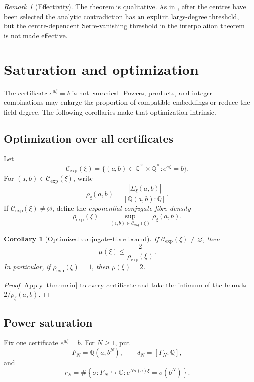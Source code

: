 \documentclass[11pt]{article}
\newcommand{\CC}{\mathbb C}
\newcommand{\QQ}{\mathbb Q}
\newcommand{\Qbar}{\overline{\mathbb Q}}
\newtheorem{corollary}[theorem]{Corollary}
\theoremstyle{definition}
\theoremstyle{remark}
\newtheorem{remark}[theorem]{Remark}
\numberwithin{equation}{section}
\begin{document}
\begin{remark}[Effectivity]
The theorem is qualitative.  As in \cite{LiuJiangZhang2026}, after the
centres have been selected the analytic contradiction has an explicit
large-degree threshold, but the centre-dependent Serre-vanishing
threshold in the interpolation theorem is not made effective.
\end{remark}

\section{Saturation and optimization}\label{sec:saturation}

The certificate $e^{a\xi}=b$ is not canonical.  Powers, products, and
integer combinations may enlarge the proportion of compatible
embeddings or reduce the field degree.  The following corollaries make
that optimization intrinsic.

\subsection{Optimization over all certificates}

Let
\[
 \mathcal C_{\exp}(\xi)=
 \{(a,b)\in\Qbar^\times\times\Qbar^\times:e^{a\xi}=b\}.
\]
For $(a,b)\in\mathcal C_{\exp}(\xi)$, write
\[
 \rho_\xi(a,b)=
 \frac{|\Sigma_\xi(a,b)|}{[\QQ(a,b):\QQ]}.
\]
If $\mathcal C_{\exp}(\xi)\ne\varnothing$, define the
\emph{exponential conjugate-fibre density}
\begin{equation}\label{eq:rhoexp}
 \rho_{\exp}(\xi)=
 \sup_{(a,b)\in\mathcal C_{\exp}(\xi)}\rho_\xi(a,b).
\end{equation}

\begin{corollary}[Optimized conjugate-fibre bound]\label{cor:optimized}
If $\mathcal C_{\exp}(\xi)\ne\varnothing$, then
\[
 \boxed{\mu(\xi)\le\frac{2}{\rho_{\exp}(\xi)}}.
\]
In particular, if $\rho_{\exp}(\xi)=1$, then $\mu(\xi)=2$.
\end{corollary}

\begin{proof}
Apply \cref{thm:main} to every certificate and take the infimum of the
bounds $2/\rho_\xi(a,b)$.
\end{proof}

\subsection{Power saturation}

Fix one certificate $e^{a\xi}=b$.  For $N\ge1$, put
\begin{equation}\label{eq:power-data}
 F_N=\QQ(a,b^N),\qquad d_N=[F_N:\QQ],
\end{equation}
and
\begin{equation}\label{eq:power-r}
 r_N=\#\left\{\sigma:F_N\hookrightarrow\CC:
 e^{N\sigma(a)\xi}=\sigma(b^N)\right\}.
\end{equation}
\end{document}
